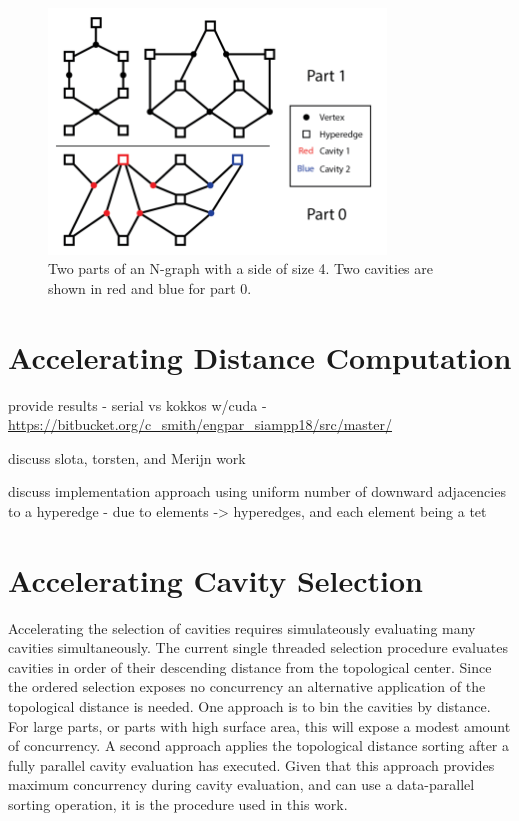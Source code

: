 \documentclass[graybox]{svmult}
\begin{document}
\begin{figure}
  \centering
  \includegraphics[width=0.8\textwidth]{images/PartBoundary.png}
  \caption{Two parts of an N-graph with a side of size 4.
    Two cavities are shown in red and blue for part 0.
  }
\end{figure}

\section{Accelerating Distance Computation} \label{sec:dist}

provide results - serial vs kokkos w/cuda -
\url{https://bitbucket.org/c_smith/engpar_siampp18/src/master/}

discuss slota, torsten, and Merijn work

discuss implementation approach using uniform number of downward adjacencies to
a hyperedge - due to elements -> hyperedges, and each element being a tet

\section{Accelerating Cavity Selection} \label{sec:select}

Accelerating the selection of cavities requires simulateously evaluating many
cavities simultaneously.
The current single threaded selection procedure evaluates cavities in order of
their descending distance from the topological center.
Since the ordered selection exposes no concurrency an alternative application of
the topological distance is needed.
One approach is to bin the cavities by distance.
For large parts, or parts with high surface area, this will expose a modest
amount of concurrency.
A second approach applies the topological distance sorting after a fully
parallel cavity evaluation has executed.
Given that this approach provides maximum concurrency during cavity evaluation,
and can use a data-parallel sorting operation, it is the procedure used in this
work.
\end{document}
